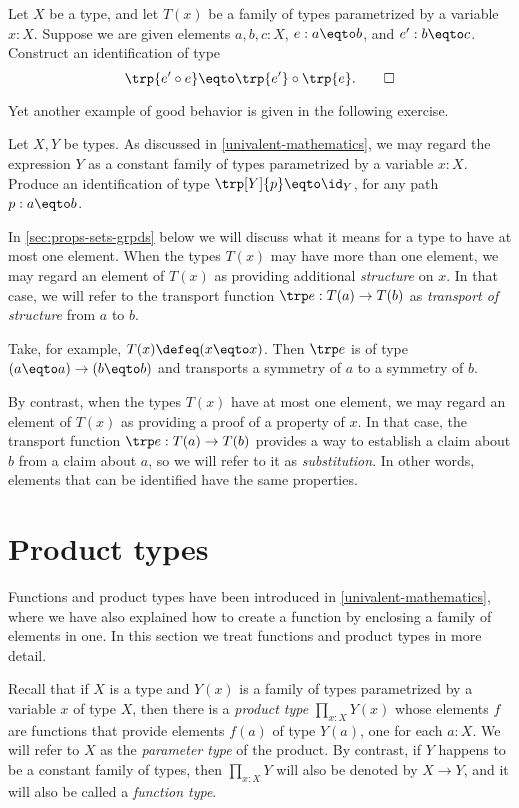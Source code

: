 \begin{xca}\label{xca:trp-compose}
  Let $X$ be a type, and let $T(x)$ be a family of types parametrized by a variable $x:X$.
  Suppose we are given elements $a,b,c:X$, $e:a \eqto b$, and $e':b \eqto c$.  Construct an identification of type
  \[
    \trp {e'\circ e} \eqto \trp {e'} \circ \trp {e}.\qedhere
  \]
\end{xca}

Yet another example of good behavior is given in the following exercise.

\begin{xca}\label{xca:trp-nondep}
  Let $X,Y$ be types.
  As discussed in \cref{univalent-mathematics}, we may regard the expression $Y$ as a constant family of types parametrized by a variable $x:X$.
  Produce an identification of type $\trp[Y]{p} \eqto \id_Y$, for any path $p:a \eqto b$.
\end{xca}

In \cref{sec:props-sets-grpds} below we will discuss what it means for a type to have at most one element.
When the types $T(x)$ may have more than one element,
we may regard an element of $T(x)$ as providing additional \emph{structure} on $x$.
In that case, we will refer to the transport function $\trp e : T(a) \to T(b)$ as
\emph{transport of structure} from $a$ to $b$.

Take, for example, $T(x)\defeq (x \eqto x)$.
Then $\trp e$ is of type $(a \eqto a) \to (b \eqto b)$ and transports a
symmetry of $a$ to a symmetry of $b$.

By contrast, when the types
$T(x)$ have at most one element, we may regard an element of $T(x)$
as providing a proof of a property of $x$. In that case, the transport
function $\trp e : T(a) \to T(b)$ provides a way to establish a claim about $b$
from a claim about $a$, so we will refer to it as \emph{substitution}.  In
other words, elements that can be identified have the same properties.

\section{Product types}
\label{sec:product-types}

Functions and product types have been introduced in \cref{univalent-mathematics}, where we have also explained how to create a function by
enclosing a family of elements in one.  In this section we treat functions and product types in more detail.

Recall that if $X$ is a type and $Y(x)$ is a family of types parametrized by a variable $x$ of type $X$, then there is a \emph{product type}
$\prod_{x:X} Y(x)$ whose elements $f$ are functions that provide elements $f(a)$ of type $Y(a)$, one for each $a:X$.  We will refer to $X$ as the
\emph{parameter type} of the product. By contrast, if $Y$ happens to be a constant family of types, then
$\prod_{x:X} Y$ will also be denoted by $X \to Y$, and it will also be called a \emph{function type}.

